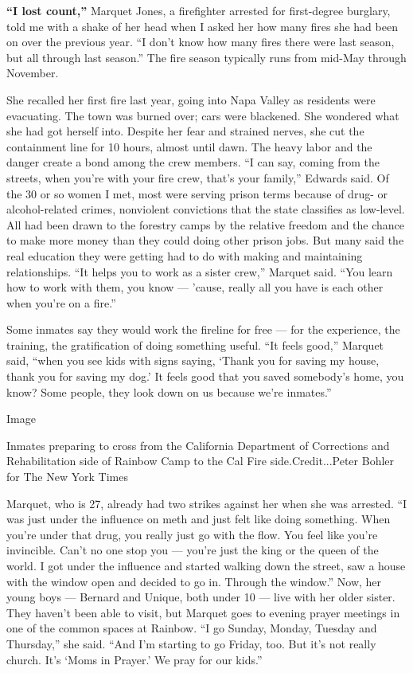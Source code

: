 \textbf{``I lost count,''} Marquet Jones, a firefighter arrested for
first-degree burglary, told me with a shake of her head when I asked her
how many fires she had been on over the previous year. ``I don't know
how many fires there were last season, but all through last season.''
The fire season typically runs from mid-May through November.

She recalled her first fire last year, going into Napa Valley as
residents were evacuating. The town was burned over; cars were
blackened. She wondered what she had got herself into. Despite her fear
and strained nerves, she cut the containment line for 10 hours, almost
until dawn. The heavy labor and the danger create a bond among the crew
members. ``I can say, coming from the streets, when you're with your
fire crew, that's your family,'' Edwards said. Of the 30 or so women I
met, most were serving prison terms because of drug- or alcohol-related
crimes, nonviolent convictions that the state classifies as low-level.
All had been drawn to the forestry camps by the relative freedom and the
chance to make more money than they could doing other prison jobs. But
many said the real education they were getting had to do with making and
maintaining relationships. ``It helps you to work as a sister crew,''
Marquet said. ``You learn how to work with them, you know --- 'cause,
really all you have is each other when you're on a fire.''

Some inmates say they would work the fireline for free --- for the
experience, the training, the gratification of doing something useful.
``It feels good,'' Marquet said, ``when you see kids with signs saying,
`Thank you for saving my house, thank you for saving my dog.' It feels
good that you saved somebody's home, you know? Some people, they look
down on us because we're inmates.''

Image

Inmates preparing to cross from the California Department of Corrections
and Rehabilitation side of Rainbow Camp to the Cal Fire
side.Credit...Peter Bohler for The New York Times

Marquet, who is 27, already had two strikes against her when she was
arrested. ``I was just under the influence on meth and just felt like
doing something. When you're under that drug, you really just go with
the flow. You feel like you're invincible. Can't no one stop you ---
you're just the king or the queen of the world. I got under the
influence and started walking down the street, saw a house with the
window open and decided to go in. Through the window.'' Now, her young
boys --- Bernard and Unique, both under 10 --- live with her older
sister. They haven't been able to visit, but Marquet goes to evening
prayer meetings in one of the common spaces at Rainbow. ``I go Sunday,
Monday, Tuesday and Thursday,'' she said. ``And I'm starting to go
Friday, too. But it's not really church. It's `Moms in Prayer.' We pray
for our kids.''

